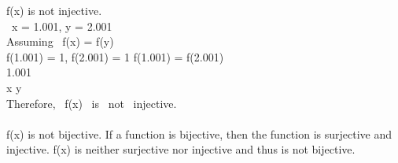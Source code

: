 \documentclass[12pt]{article}
\theoremstyle{definition}
\numberwithin{equation}{subsection}
\begin{document}
f(x) is not injective.
\\ \exists \ x = 1.001, y = 2.001 \in {}
\\ Assuming \ f(x) = f(y)
\\ f(1.001) = 1, f(2.001) = 1 \implies f(1.001) = f(2.001)
\\ 1.001 
\\ x \neq y 
\\ Therefore, \ f(x) \ is \ not \ injective. \\ \\

f(x) is not bijective. If a function is bijective, then the function is surjective and injective. f(x) is neither surjective nor injective and thus is not bijective.
\end{document}
